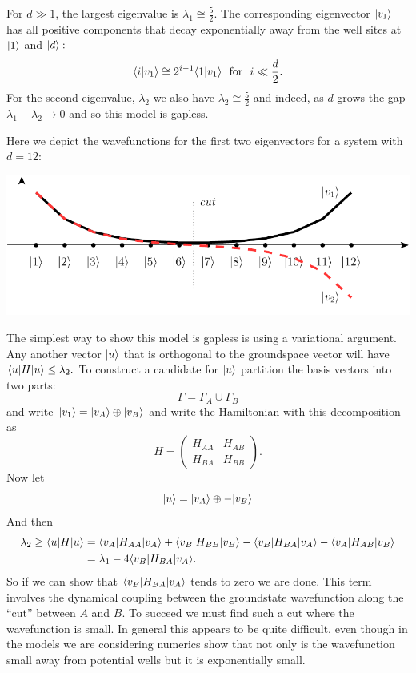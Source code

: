 \documentclass[12pt]{article}
\begin{document}
For $d\gg 1$, the largest
eigenvalue is $\lambda_1 \cong \frac{5}{2}$.
The corresponding eigenvector $|{v_1}\rangle$
has all positive components that
decay exponentially away from the well sites
at $|{1}\rangle$ and $|{d}\rangle:$
$$
    \langle{i}|{v_1}\rangle 
    \cong 2^{i-1} \langle{1}|{v_1}\rangle
    \ \ \mbox{for}\ \ i\ll \frac{d}{2}.
$$
For the second eigenvalue, $\lambda_2$
we also have  $\lambda_2 \cong \frac{5}{2}$
and indeed, as $d$ grows
the gap $\lambda_1 - \lambda_2 \rightarrow 0$
and so this model is gapless.

Here we depict the wavefunctions for
the first two eigenvectors for a system with $d=12:$
\begin{center}
\includegraphics[]{pic-dwell.pdf}
\end{center}
The simplest way to show this model
is gapless is using a variational
argument.
Any another vector $|{u}\rangle$
that is orthogonal to the groundspace
vector will have $\langle{u}|H|{u}\rangle \le \lambda_2.$
To construct a candidate for $|{u}\rangle$
partition the
basis vectors into two parts:
$$
    \Gamma = \Gamma_A \cup \Gamma_B
$$
and write $|{v_1}\rangle = 
|{v_A}\rangle\oplus|{v_B}\rangle$
and write the Hamiltonian with this
decomposition as
$$
H = 
\left(\begin{array}{ll}
H_{AA} & H_{AB} \\
H_{BA} & H_{BB}
\end{array}\right).
$$
Now let
$$
    |{u}\rangle = |{v_A}\rangle \oplus -|{v_B}\rangle
$$
And then
\begin{align*}
    \lambda_2 \ge \langle{u}|H|{u}\rangle &= 
\langle{v_A}|H_{AA}|{v_A}\rangle +
\langle{v_B}|H_{BB}|{v_B}\rangle -
\langle{v_B}|H_{BA}|{v_A}\rangle -
\langle{v_A}|H_{AB}|{v_B}\rangle \\
    &= \lambda_1 - 4 \langle{v_B}|H_{BA}|{v_A}\rangle.
\end{align*}
So if we can show that 
$ \langle{v_B}|H_{BA}|{v_A}\rangle$
tends to zero we are done.
This term involves the 
dynamical coupling between the
groundstate wavefunction along
the ``cut'' between $A$ and $B$.
To succeed we must find such a cut where
the wavefunction is small. In general
this appears to be quite difficult,
even though in the models we are considering
numerics show that not only is the
wavefunction small away from potential wells
but it is exponentially small.
\end{document}
